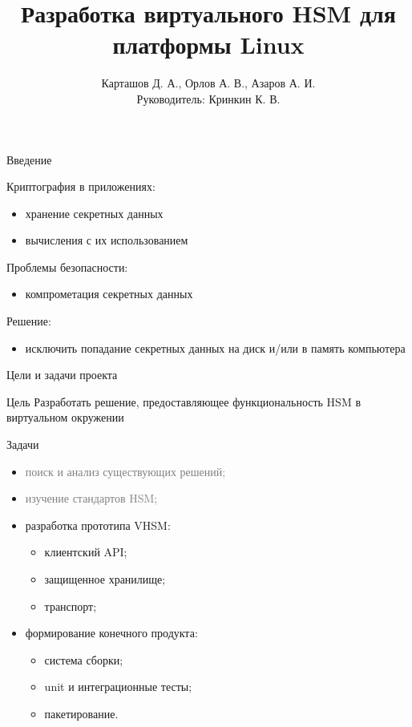 \documentclass[utf8, 11pt]{beamer}
\author[ ]{Карташов Д. А., Орлов А. В., Азаров А. И. \\ Руководитель: Кринкин К. В.}
\title[Virtual HSM]{Разработка виртуального HSM для платформы Linux}
\institute[СПбАУ]
{
  Кафедра математических и информационных технологий\\
  Санкт-Петербургский Академический университет
}
\date{ }
\begin{document}
\begin{frame}
  \titlepage
\end{frame}

\begin{frame}{Введение}

Криптография в приложениях:
\begin{itemize}
\item хранение секретных данных
\item вычисления с их использованием
\end{itemize}

\vspace*{\fill}

Проблемы безопасности:
\begin{itemize}
\item компрометация секретных данных
\end{itemize}

\vspace*{\fill}

Решение:
\begin{itemize}
\item исключить попадание секретных данных на диск и/или в память компьютера
\end{itemize}

\vspace*{\fill}

\end{frame}

\begin{frame}{Цели и задачи проекта}

\begin{block}{Цель}
Разработать решение, предоставляющее функциональность HSM в виртуальном окружении
\end{block}

\vspace*{\fill}

\begin{block}{Задачи}
\begin{itemize}
\item \textcolor{gray}{поиск и анализ существующих решений;}
\item \textcolor{gray}{изучение стандартов HSM;}
\item разработка прототипа VHSM:
\begin{itemize}
	\item клиентский API;
	\item защищенное хранилище;
	\item транспорт;
\end{itemize}
\item формирование конечного продукта:
\begin{itemize}
	\item система сборки;
	\item unit и интеграционные тесты;
	\item пакетирование.
\end{itemize}
\end{itemize}
\end{block}
\end{frame}
\end{document}

